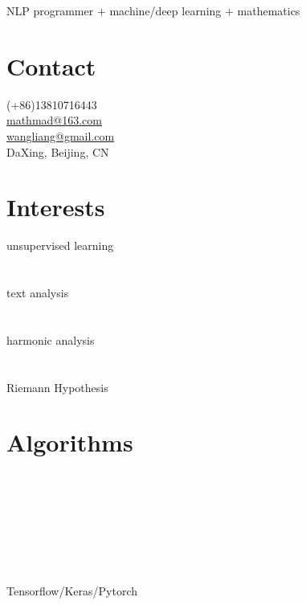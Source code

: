 \documentclass[letterpaper,10pt]{Resume_Liang}
\begin{document}
\thispagestyle{empty}
 {NLP programmer + machine/deep learning + mathematics}
\begin{aside}
  \section{Contact}
    (+86)13810716443\\
    \href{mailto:mathmad@163.com}{mathmad@163.com}\\
    \href{mailto:wangliangster@gmail.com}{wangliang@gmail.com}\\
    DaXing, Beijing, CN\\
  \vspace{\baselineskip}
  \section{Interests}
  unsupervised learning\\
  \\
  \\
   text analysis\\
  \\
  \\
   harmonic analysis\\
  \\
  \\
  Riemann Hypothesis\\
   \vspace{\baselineskip}
  \section{Algorithms}
 \\
  \\
  \\
  \\
  \\
  \\
  \\
 Tensorflow/Keras/Pytorch\\
  \vspace{\baselineskip}

\end{aside}
\end{document}
